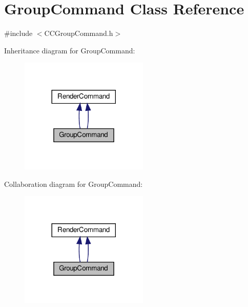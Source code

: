 \hypertarget{classGroupCommand}{}\section{Group\+Command Class Reference}
\label{classGroupCommand}


{\ttfamily \#include $<$C\+C\+Group\+Command.\+h$>$}



Inheritance diagram for Group\+Command\+:
\nopagebreak
\begin{figure}[H]
\begin{center}
\leavevmode
\includegraphics[width=173pt]{classGroupCommand__inherit__graph}
\end{center}
\end{figure}


Collaboration diagram for Group\+Command\+:
\nopagebreak
\begin{figure}[H]
\begin{center}
\leavevmode
\includegraphics[width=173pt]{classGroupCommand__coll__graph}
\end{center}
\end{figure}

